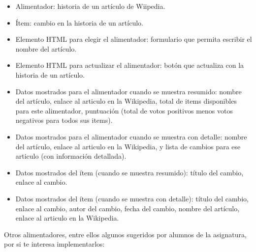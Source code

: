 \begin{itemize}
  \begin{itemize}
  \item Alimentador: historia de un artículo de Wiipedia.
  \item Ítem: cambio en la historia de un artículo.
  \item Elemento HTML para elegir el alimentador: formulario que permita escribir el nombre del artículo.
  \item Elemento HTML para actualizar el alimentador: botón que actualiza con la historia de un artículo.
  \item Datos mostrados para el alimentador cuando se muestra resumido: nombre del artículo, enlace al articulo en la Wikipedia, total de items disponibles para este alimentador, puntuación (total de votos positivos menos votos negativos para todos sus items).
  \item Datos mostrados para el alimentador cuando se muestra con detalle: nombre del artículo, enlace al articulo en la Wikipedia, y lista de cambios para ese articulo (con información detallada).
  \item Datos mostrados del ítem (cuando se muestra resumido): título del cambio, enlace al cambio.
  \item Datos mostrados del ítem (cuando se muestra con detalle): título del cambio, enlace al cambio, autor del cambio, fecha del cambio, nombre del artículo, enlace al articulo en la Wikipedia.
  \end{itemize}

\end{itemize}

Otros alimentadores, entre ellos algunos sugeridos por alumnos de la asignatura, por si te interesa implementarlos:

